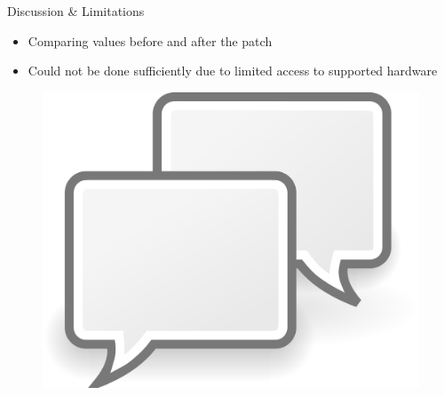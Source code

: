 \documentclass[aspectratio=169]{beamer}
[aspectratio=169] %
\begin{document}
\begin{frame}{Discussion \& Limitations}
  \begin{minipage}{0.49\textwidth} 
    \begin{itemize}
      \item Comparing values before and after the patch
      \item Could not be done sufficiently due to limited access to supported hardware
    \end{itemize}
  \end{minipage}
  \hfill
  \begin{minipage}{0.49\textwidth} 
    \begin{figure}
      \centering
      \includegraphics[height=0.5\textheight]{figures/comments.png}
    \end{figure}
  \end{minipage}
\end{frame}


\section*{}
\end{document}
